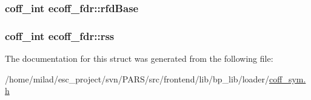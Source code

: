 \label{structecoff__fdr_ad8716975111f78844557ad0c2e1da75c}
\hypertarget{structecoff__fdr_a24a42274fb666299d163bb9edf499557}{
\subsubsection[{rfdBase}]{\setlength{\rightskip}{0pt plus 5cm}coff\_\-int {\bf ecoff\_\-fdr::rfdBase}}}
\label{structecoff__fdr_a24a42274fb666299d163bb9edf499557}
\hypertarget{structecoff__fdr_a6a3dca809302b75535424ba06958ed4b}{
\subsubsection[{rss}]{\setlength{\rightskip}{0pt plus 5cm}coff\_\-int {\bf ecoff\_\-fdr::rss}}}
\label{structecoff__fdr_a6a3dca809302b75535424ba06958ed4b}


The documentation for this struct was generated from the following file:\begin{DoxyCompactItemize}
\item 
/home/milad/esc\_\-project/svn/PARS/src/frontend/lib/bp\_\-lib/loader/\hyperlink{coff__sym_8h}{coff\_\-sym.h}\end{DoxyCompactItemize}
